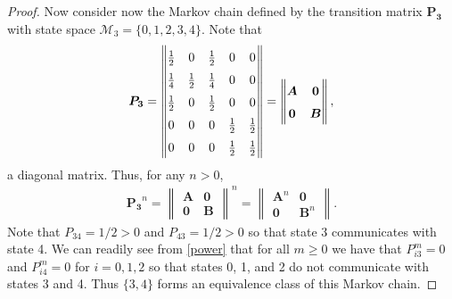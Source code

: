 \begin{proof}
  Now consider now the Markov chain defined by the transition matrix $\boldsymbol{P_3}$ with state space $\mathcal{M}_3 = \{0, 1, 2, 3, 4\}$.
  Note that
  \begin{align*}
    \renewcommand\arraystretch{1.5}
    \boldsymbol{P_3} =
    \begin{Vmatrix}
      \frac{1}{2} & 0           & \frac{1}{2} & 0           & 0           \\
      \frac{1}{4} & \frac{1}{2} & \frac{1}{4} & 0           & 0           \\
      \frac{1}{2} & 0           & \frac{1}{2} & 0           & 0           \\
      0           & 0           & 0           & \frac{1}{2} & \frac{1}{2} \\
      0           & 0           & 0           & \frac{1}{2} & \frac{1}{2} \\
    \end{Vmatrix}
    =
    \begin{Vmatrix}
      \boldsymbol{A} & \boldsymbol{0} \\
      \boldsymbol{0} & \boldsymbol{B}
    \end{Vmatrix},
  \end{align*}
  a diagonal matrix. Thus, for any $n > 0$,
  \begin{align}\label{power}
    \boldsymbol{P_3}^n
    =
    \begin{Vmatrix}
      \boldsymbol{A} & \boldsymbol{0} \\
      \boldsymbol{0} & \boldsymbol{B}
    \end{Vmatrix}^n
    =
    \begin{Vmatrix}
      \boldsymbol{A}^n & \boldsymbol{0} \\
      \boldsymbol{0} & \boldsymbol{B}^n
    \end{Vmatrix}.
  \end{align}
  Note that $P_{34} = 1/2 > 0$ and $P_{43} = 1/2 > 0$ so that state 3 communicates with state 4.
  We can readily see from \eqref{power} that for all $m\geq 0$ we have that
  $P_{i3}^m =0$ and $ P_{i4}^m = 0$ for $i=0,1,2$ so that states 0, 1, and 2 do not communicate with states 3 and 4.
  Thus $\{3, 4\}$ forms an equivalence class of this Markov chain.


\end{proof}
